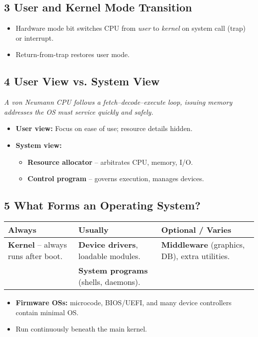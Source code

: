 \documentclass{article}
\begin{document}
\subsection*{3 User and Kernel Mode Transition}
\begin{itemize}
    \item Hardware mode bit switches CPU from \emph{user} to \emph{kernel} on system call (trap) or interrupt.
    \item Return-from-trap restores user mode.
\end{itemize}

\subsection*{4 User View vs. System View}
\textit{A von Neumann CPU follows a fetch–decode–execute loop, issuing memory addresses the OS must service quickly and safely.}

\begin{itemize}
    \item \textbf{User view:} Focus on ease of use; resource details hidden.
    \item \textbf{System view:}
    \begin{itemize}
        \item \textbf{Resource allocator} – arbitrates CPU, memory, I/O.
        \item \textbf{Control program} – governs execution, manages devices.
    \end{itemize}
\end{itemize}

\subsection*{5 What Forms an Operating System?}
\centering
\begin{tabular}{>{\raggedright}p{} >{\raggedright}p{} >{\raggedright\arraybackslash}p{}}
\toprule
\textbf{Always} & \textbf{Usually} & \textbf{Optional / Varies} \\
\midrule
\textbf{Kernel} – always runs after boot. & \textbf{Device drivers}, loadable modules. & \textbf{Middleware} (graphics, DB), extra utilities. \\
& \textbf{System programs} (shells, daemons). & \\
\bottomrule
\end{tabular}
\vspace{\baselineskip} %
\begin{itemize}
    \item \textbf{Firmware OSs:} microcode, BIOS/UEFI, and many device controllers contain minimal OS.
    \item Run continuously beneath the main kernel.
\end{itemize}
\end{document}
